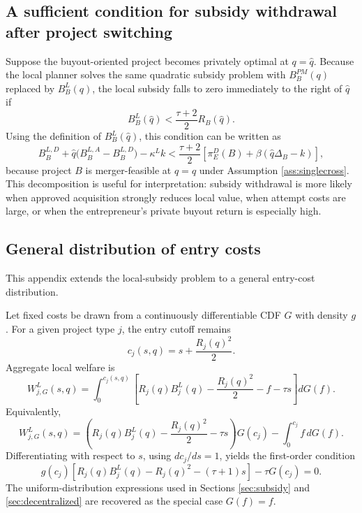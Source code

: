 \subsection{A sufficient condition for subsidy withdrawal after project switching}

Suppose the buyout-oriented project becomes privately optimal at \(q=\hat q\).
Because the local planner solves the same quadratic subsidy problem with \(B_B^{PM}(q)\) replaced by \(B_B^L(q)\), the local subsidy falls to zero immediately to the right of \(\hat q\) if
\begin{equation}
    B_B^L(\hat q)
    <
    \frac{\tau+2}{2}R_B(\hat q).
\end{equation}
Using the definition of \(B_B^L(\hat q)\), this condition can be written as
\begin{equation}
    B_B^{L,D}
    +
    \hat q\bigl(B_B^{L,A}-B_B^{L,D}\bigr)
    -
    \kappa^L k
    <
    \frac{\tau+2}{2}
    \left[
        \pi_E^D(B)+\beta(\hat q\Delta_B-k)
    \right],
\end{equation}
because project \(B\) is merger-feasible at \(q=\hat q\) under Assumption \ref{ass:singlecross}.
This decomposition is useful for interpretation:
subsidy withdrawal is more likely when approved acquisition strongly reduces local value, when attempt costs are large, or when the entrepreneur's private buyout return is especially high.

\subsection{General distribution of entry costs}

This appendix extends the local-subsidy problem to a general entry-cost distribution.

Let fixed costs be drawn from a continuously differentiable CDF \(G\) with density \(g\).
For a given project type \(j\), the entry cutoff remains
\begin{equation}
    c_j(s,q)=s+\frac{R_j(q)^2}{2}.
\end{equation}
Aggregate local welfare is
\begin{equation}\label{eq:WgeneralGlocal}
    W_{j,G}^L(s,q)
    =
    \int_0^{c_j(s,q)}
    \left[
        R_j(q)B_j^L(q)
        -
        \frac{R_j(q)^2}{2}
        -
        f
        -
        \tau s
    \right] dG(f).
\end{equation}
Equivalently,
\begin{equation}
    W_{j,G}^L(s,q)
    =
    \left(
        R_j(q)B_j^L(q)
        -
        \frac{R_j(q)^2}{2}
        -
        \tau s
    \right)
    G(c_j)
    -
    \int_0^{c_j} f\,dG(f).
\end{equation}
Differentiating with respect to \(s\), using \(dc_j/ds=1\), yields the first-order condition
\begin{equation}\label{eq:focgeneralGlocal}
    g(c_j)
    \left[
        R_j(q)B_j^L(q)
        -
        R_j(q)^2
        -
        (\tau+1)s
    \right]
    -
    \tau G(c_j)
    =
    0.
\end{equation}
The uniform-distribution expressions used in Sections \ref{sec:subsidy} and \ref{sec:decentralized} are recovered as the special case \(G(f)=f\).

